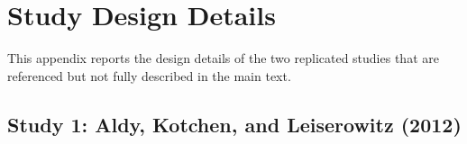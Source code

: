 \documentclass[12pt]{article}
\begin{document}
\newpage
\printbibliography

%
%
%

\appendix
\renewcommand{\thefigure}{\thesection.\arabic{figure}}
\renewcommand{\thetable}{\thesection.\arabic{table}}

\section{Study Design Details}\label{app:study-details}

This appendix reports the design details of the two replicated studies that are referenced but not fully described in the main text.

\subsection{Study 1: Aldy, Kotchen, and Leiserowitz (2012)}
\end{document}

